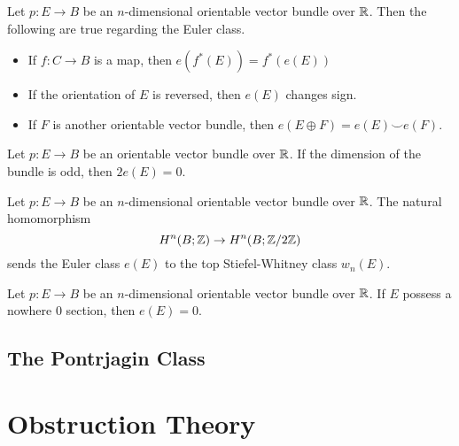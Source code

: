 \documentclass[a4paper]{article}
\begin{document}
\begin{prp}{}{} Let $p:E\to B$ be an $n$-dimensional orientable vector bundle over $\mathbb{R}$. Then the following are true regarding the Euler class. 
\begin{itemize}
\item If $f:C\to B$ is a map, then $e(f^\ast(E))=f^\ast(e(E))$
\item If the orientation of $E$ is reversed, then $e(E)$ changes sign. 
\item If $F$ is another orientable vector bundle, then $e(E\oplus F)=e(E)\smile e(F)$. 
\end{itemize}
\end{prp}

\begin{prp}{}{} Let $p:E\to B$ be an orientable vector bundle over $\mathbb{R}$. If the dimension of the bundle is odd, then $2e(E)=0$. 
\end{prp}

\begin{prp}{}{} Let $p:E\to B$ be an $n$-dimensional orientable vector bundle over $\mathbb{R}$. The natural homomorphism $$H^n(B;\mathbb{Z})\to H^n(B;\mathbb{Z}/2\mathbb{Z})$$ sends the Euler class $e(E)$ to the top Stiefel-Whitney class $w_n(E)$. 
\end{prp}

\begin{prp}{}{} Let $p:E\to B$ be an $n$-dimensional orientable vector bundle over $\mathbb{R}$. If $E$ possess a nowhere $0$ section, then $e(E)=0$. 
\end{prp}

\subsection{The Pontrjagin Class}

\pagebreak
\section{Obstruction Theory}
\end{document}
